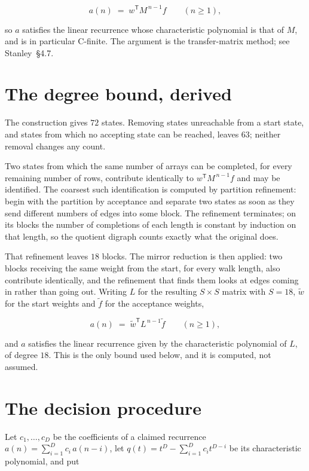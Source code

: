 \documentclass[11pt]{article}
\theoremstyle{definition}
\begin{document}
\[a(n) \;=\; w^{\mathsf T} M^{\,n-1} f \qquad (n \ge 1),\]

so $a$ satisfies the linear recurrence whose characteristic polynomial is that of $M$, and is in particular C-finite. The argument is the transfer-matrix method; see Stanley~\S4.7.

\section{The degree bound, derived}

The construction gives $72$ states. Removing states unreachable from a start state, and states from which no accepting state can be reached, leaves $63$; neither removal changes any count.

Two states from which the same number of arrays can be completed, for every remaining number of rows, contribute identically to $w^{\mathsf T}M^{\,n-1}f$ and may be identified. The coarsest such identification is computed by partition refinement: begin with the partition by acceptance and separate two states as soon as they send different numbers of edges into some block. The refinement terminates; on its blocks the number of completions of each length is constant by induction on that length, so the quotient digraph counts exactly what the original does.

That refinement leaves $18$ blocks. The mirror reduction is then applied: two blocks receiving the same weight from the start, for every walk length, also contribute identically, and the refinement that finds them looks at edges coming in rather than going out. Writing $L$ for the resulting $S \times S$ matrix with $S = 18$, $\tilde w$ for the start weights and $\tilde f$ for the acceptance weights,

\[a(n) \;=\; \tilde w^{\mathsf T} L^{\,n-1} \tilde f \qquad (n \ge 1),\]

and $a$ satisfies the linear recurrence given by the characteristic polynomial of $L$, of degree $18$. This is the only bound used below, and it is computed, not assumed.

\section{The decision procedure}

Let $c_1,\dots,c_D$ be the coefficients of a claimed recurrence $a(n) = \sum_{i=1}^{D} c_i\,a(n-i)$, let $q(t) = t^{D} - \sum_{i=1}^{D} c_i t^{D-i}$ be its characteristic polynomial, and put
\end{document}
